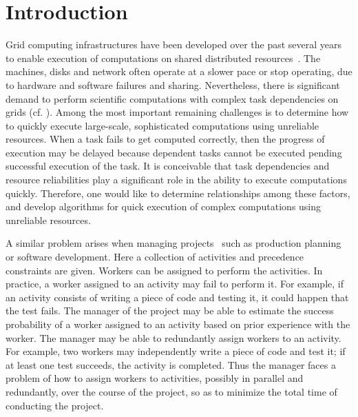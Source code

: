 \documentclass[letterpaper,11pt]{article}
\begin{document}
\section{Introduction}


Grid computing infrastructures have been developed over the past several years to enable execution of computations on shared distributed resources~\cite{FosterK04}. The machines, disks and network often operate at a slower pace or stop operating, due to hardware and software failures and sharing. Nevertheless, there is significant demand to perform scientific computations with complex task dependencies on grids (cf. \cite{Ann02,Ber+03,Inspiral,H+05}). Among the most important remaining challenges is to determine how to quickly execute large-scale, sophisticated computations using unreliable resources. When a task fails to get computed correctly, then the progress of execution may be delayed because dependent tasks cannot be executed pending successful execution of the task.
It is conceivable that task dependencies and resource reliabilities play a significant role in the ability to execute computations quickly. Therefore, one would like to determine relationships among these factors, and develop algorithms for quick execution of complex computations using unreliable resources.


A similar problem arises when managing projects~\cite{HL01} such as production planning or software development. Here a collection of activities and precedence constraints are given. Workers can be assigned to perform the activities. In practice, a worker assigned to an activity may fail to perform it. For example, if an activity consists of writing a piece of code and testing it, it could happen that the test fails. The manager of the project may be able to estimate the success probability of a worker assigned to an activity based on prior experience with the worker. The manager may be able to redundantly assign workers to an activity. For example, two workers may independently write a piece of code and test it; if at least one test succeeds, the activity is completed. Thus the manager faces a problem of how to assign workers to activities, possibly in parallel and redundantly, over the course of the project, so as to minimize the total time of conducting the project.
\end{document}
